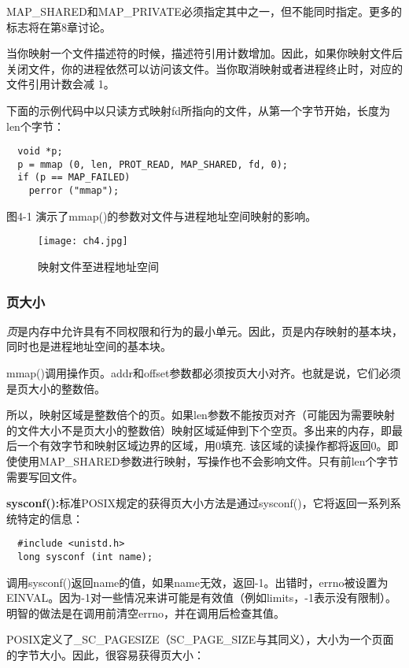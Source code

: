 MAP\_SHARED和MAP\_PRIVATE必须指定其中之一，但不能同时指定。更多的标志将在第8章讨论。

当你映射一个文件描述符的时候，描述符引用计数增加。因此，如果你映射文件后关闭文件，你的进程依然可以访问该文件。当你取消映射或者进程终止时，对应的文件引用计数会减 1。

下面的示例代码中以只读方式映射fd所指向的文件，从第一个字节开始，长度为len个字节：

\begin{lstlisting}
  void *p;
  p = mmap (0, len, PROT_READ, MAP_SHARED, fd, 0);
  if (p == MAP_FAILED)
    perror ("mmap");
\end{lstlisting}

图4-1 演示了mmap()的参数对文件与进程地址空间映射的影响。

\begin{figure}[htp]
 \centering
 \texttt{[image: ch4.jpg]}
 \caption{映射文件至进程地址空间}
\end{figure}

\subsubsection{页大小}

\emph{页}是内存中允许具有不同权限和行为的最小单元。因此，页是内存映射的基本块，同时也是进程地址空间的基本块。

mmap()调用操作页。addr和offset参数都必须按页大小对齐。也就是说，它们必须是页大小的整数倍。

所以，映射区域是整数倍个的页。如果len参数不能按页对齐（可能因为需要映射的文件大小不是页大小的整数倍）映射区域延伸到下个空页。多出来的内存，即最后一个有效字节和映射区域边界的区域，用0填充. 该区域的读操作都将返回0。即使使用MAP\_SHARED参数进行映射，写操作也不会影响文件。只有前len个字节需要写回文件。

\textbf{sysconf():}标准POSIX规定的获得页大小方法是通过sysconf()，它将返回一系列系统特定的信息：

\begin{lstlisting}
  #include <unistd.h>
  long sysconf (int name);
\end{lstlisting}

调用sysconf()返回name的值，如果name无效，返回-1。出错时，errno被设置为EINVAL。因为-1对一些情况来讲可能是有效值（例如limits，-1表示没有限制）。明智的做法是在调用前清空errno，并在调用后检查其值。

POSIX定义了\_SC\_PAGESIZE（SC\_PAGE\_SIZE与其同义），大小为一个页面的字节大小。因此，很容易获得页大小：

